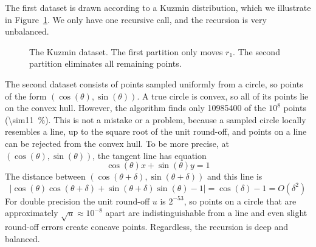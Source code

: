 The first dataset is drawn according to a Kuzmin distribution, which we illustrate in Figure~\ref{fig:kuzmin}.
We only have one recursive call, and the recursion is very unbalanced.

\begin{figure}[ht]
  \centering
  \caption{The Kuzmin dataset.
  The first partition only moves $r_1$.
  The second partition eliminates all remaining points.}%
  \label{fig:kuzmin}%
\end{figure}

The second dataset consists of points sampled uniformly from a circle, so points of the form $(\cos(\theta), \sin(\theta))$.
A true circle is convex, so all of its points lie on the convex hull.
However, the algorithm finds only \num{10985400} of the $10^8$ points (\qty{\sim11}{\percent}).
This is not a mistake or a problem, because a sampled circle locally resembles a line, up to the square root of the unit round-off, and points on a line can be rejected from the convex hull.
To be more precise, at $(\cos(\theta), \sin(\theta))$, the tangent line has equation
\[
\cos(\theta) x + \sin(\theta) y = 1
\]
The distance between $(\cos(\theta + \delta), \sin(\theta + \delta))$ and this line is
\[
|\cos(\theta)\cos(\theta + \delta) + \sin(\theta + \delta)\sin(\theta) - 1| = \cos(\delta) - 1 = O(\delta^2)
\]
For double precision the unit round-off $u$ is $2^{-53}$, so points on a circle that are approximately $\sqrt{u} \approx 10^{-8}$ apart are indistinguishable from a line and even slight round-off errors create concave points.
Regardless, the recursion is deep and balanced.

